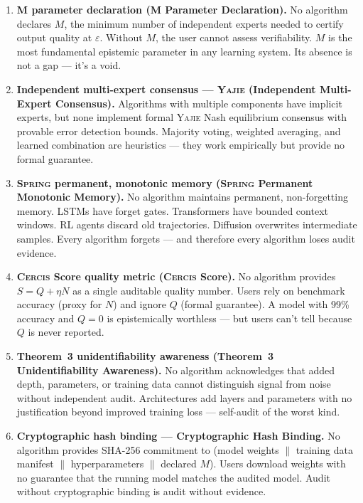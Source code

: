 \documentclass[12pt,a4paper]{article}
\theoremstyle{definition}
\newcommand{\Yajie}{\textsc{Yajie}}
\newcommand{\Spring}{\textsc{Spring}}
\newcommand{\Cercis}{\textsc{Cercis}}
\begin{document}
\begin{enumerate}[label=\textbf{\arabic*.}, nosep, leftmargin=*]
    
    \item \textbf{M parameter declaration (M Parameter Declaration).} No algorithm declares $M$, the minimum number of independent experts needed to certify output quality at $\varepsilon$. Without $M$, the user cannot assess verifiability. $M$ is the most fundamental epistemic parameter in any learning system. Its absence is not a gap — it's a void.
    
    \item \textbf{Independent multi-expert consensus — \Yajie{} (Independent Multi-Expert Consensus).} Algorithms with multiple components have implicit experts, but none implement formal \Yajie{} Nash equilibrium consensus with provable error detection bounds. Majority voting, weighted averaging, and learned combination are heuristics — they work empirically but provide no formal guarantee.
    
    \item \textbf{\Spring{} permanent, monotonic memory (\Spring{} Permanent Monotonic Memory).} No algorithm maintains permanent, non-forgetting memory. LSTMs have forget gates. Transformers have bounded context windows. RL agents discard old trajectories. Diffusion overwrites intermediate samples. Every algorithm forgets — and therefore every algorithm loses audit evidence.
    
    \item \textbf{\Cercis{} Score quality metric (\Cercis{} Score).} No algorithm provides $S = Q + \eta N$ as a single auditable quality number. Users rely on benchmark accuracy (proxy for $N$) and ignore $Q$ (formal guarantee). A model with 99\% accuracy and $Q=0$ is epistemically worthless — but users can't tell because $Q$ is never reported.
    
    \item \textbf{Theorem~3 unidentifiability awareness (Theorem~3 Unidentifiability Awareness).} No algorithm acknowledges that added depth, parameters, or training data cannot distinguish signal from noise without independent audit. Architectures add layers and parameters with no justification beyond improved training loss — self-audit of the worst kind.
    
    \item \textbf{Cryptographic hash binding — Cryptographic Hash Binding.} No algorithm provides SHA-256 commitment to (model weights $\|$ training data manifest $\|$ hyperparameters $\|$ declared $M$). Users download weights with no guarantee that the running model matches the audited model. Audit without cryptographic binding is audit without evidence.
    

\end{enumerate}
\end{document}

